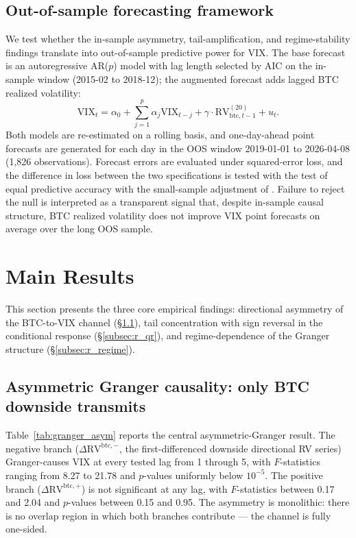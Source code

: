 \documentclass[11pt,a4paper]{article}
\begin{document}
\subsection{Out-of-sample forecasting framework}
\label{subsec:dm}

We test whether the in-sample asymmetry, tail-amplification, and regime-stability findings translate into out-of-sample predictive power for VIX. The base forecast is an autoregressive AR($p$) model with lag length selected by AIC on the in-sample window (2015-02 to 2018-12); the augmented forecast adds lagged BTC realized volatility:
\begin{equation}
\text{VIX}_t = \alpha_0 + \sum_{j=1}^{p} \alpha_j \text{VIX}_{t-j} + \gamma \cdot \text{RV}^{(20)}_{\text{btc}, t-1} + u_t.
\label{eq:oos_aug}
\end{equation}
Both models are re-estimated on a rolling basis, and one-day-ahead point forecasts are generated for each day in the OOS window 2019-01-01 to 2026-04-08 (1{,}826 observations). Forecast errors are evaluated under squared-error loss, and the difference in loss between the two specifications is tested with the \citet{diebold1995} test of equal predictive accuracy with the small-sample adjustment of \citet{harvey1997}. Failure to reject the null is interpreted as a transparent signal that, despite in-sample causal structure, BTC realized volatility does not improve VIX point forecasts on average over the long OOS sample.

\section{Main Results}
\label{sec:results}

This section presents the three core empirical findings: directional asymmetry of the BTC-to-VIX channel (\S\ref{subsec:r_asym}), tail concentration with sign reversal in the conditional response (\S\ref{subsec:r_qr}), and regime-dependence of the Granger structure (\S\ref{subsec:r_regime}).

\subsection{Asymmetric Granger causality: only BTC downside transmits}
\label{subsec:r_asym}

Table~\ref{tab:granger_asym} reports the central asymmetric-Granger result. The negative branch ($\Delta \text{RV}^{\text{btc},-}$, the first-differenced downside directional RV series) Granger-causes VIX at every tested lag from 1 through 5, with $F$-statistics ranging from 8.27 to 21.78 and $p$-values uniformly below $10^{-5}$. The positive branch ($\Delta \text{RV}^{\text{btc},+}$) is not significant at any lag, with $F$-statistics between 0.17 and 2.04 and $p$-values between 0.15 and 0.95. The asymmetry is monolithic: there is no overlap region in which both branches contribute --- the channel is fully one-sided.%
\end{document}
